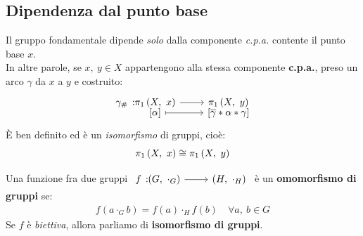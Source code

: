 \subsection{Dipendenza dal punto base}
\begin{theorema}\label{dipendenzaptobasegruf}
	Il gruppo fondamentale dipende \textit{solo} dalla componente \textit{c.p.a.} contente il punto base $x$.\\
	In altre parole, se $x,\ y\in X$ appartengono alla stessa componente \textbf{c.p.a.}, preso un arco $\gamma$ da $x$ a $y$ e costruito:
	\begin{equation}
		\funztot{\gamma_{\#}}{\gruf{X}{x}}{\gruf{X}{y}}{\left[\alpha\right]}{\left[\overline{\gamma}\ast\alpha\ast\gamma\right]}
	\end{equation}
	È ben definito ed è un \textit{isomorfismo} di gruppi, cioè:
	\begin{equation}
		\gruf{X}{x}\cong\gruf{X}{y}
	\end{equation}
\vspace{-6mm}
\end{theorema}
\begin{remember}
	Una funzione fra due gruppi $\funz{f}{\left(G,\ \cdot_G\right)}{\left(H,\ \cdot_H\right)}$ è un \textbf{omomorfismo di gruppi} se:
	\begin{gather*}
		f\left(a\cdot_G b\right)=f\left(a\right)\cdot_H f\left(b\right)\quad \forall a,\ b\in G
	\end{gather*}
	Se $f$ è \textit{biettiva}, allora parliamo di \textbf{isomorfismo di gruppi}.
\end{remember}
